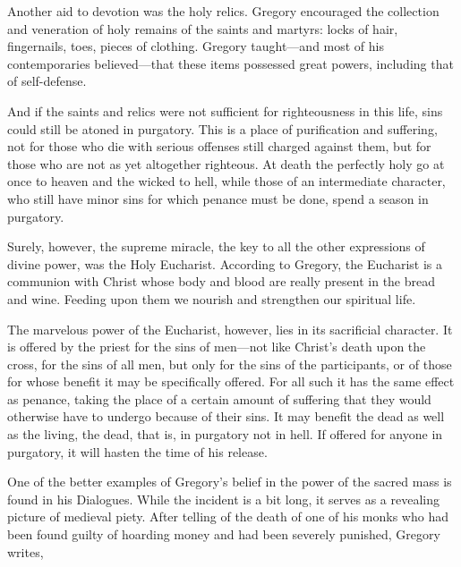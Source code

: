 Another aid to devotion was the holy relics. Gregory encouraged the collection and veneration of
holy remains of the saints and martyrs: locks of hair, fingernails, toes, pieces of clothing.
Gregory taught—and most of his contemporaries believed—that these items possessed great powers,
including that of self-defense.

And if the saints and relics were not sufficient for righteousness in this life, sins could still be
atoned in purgatory. This is a place of purification and suffering, not for those who die with
serious offenses still charged against them, but for those who are not as yet altogether righteous.
At death the perfectly holy go at once to heaven and the wicked to hell, while those of an
intermediate character, who still have minor sins for which penance must be done, spend a season in
purgatory.

Surely, however, the supreme miracle, the key to all the other expressions of divine power, was the
Holy Eucharist. According to Gregory, the Eucharist is a communion with Christ whose body and blood
are really present in the bread and wine. Feeding upon them we nourish and strengthen our spiritual
life.

The marvelous power of the Eucharist, however, lies in its sacrificial character. It is offered by
the priest for the sins of men—not like Christ’s death upon the cross, for the sins of all men, but
only for the sins of the participants, or of those for whose benefit it may be specifically offered.
For all such it has the same effect as penance, taking the place of a certain amount of suffering
that they would otherwise have to undergo because of their sins. It may benefit the dead as well as
the living, the dead, that is, in purgatory not in hell. If offered for anyone in purgatory, it will
hasten the time of his release.

One of the better examples of Gregory’s belief in the power of the sacred mass is found in his
Dialogues. While the incident is a bit long, it serves as a revealing picture of medieval piety.
After telling of the death of one of his monks who had been found guilty of hoarding money and had
been severely punished, Gregory writes,

